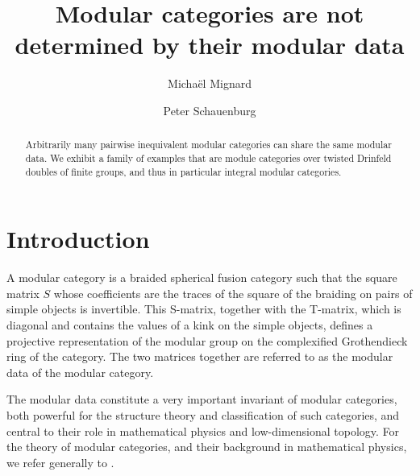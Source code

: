 \documentclass[12pt]{amsart}
\theoremstyle{remark}
\theoremstyle{definition}
\numberwithin{equation}{section}
\begin{document}
\title[Equivalent modular data]{Modular categories are not determined by their modular data}
\author{Michaël Mignard}
\author{Peter Schauenburg}
\address{Institut de Math{\'e}matiques de Bourgogne, UMR 5584 CNRS
\\
Universit{\'e} Bourgogne Franche-Comté\\
F-21000 Dijon\\France}

\keywords{}

\begin{abstract}
Arbitrarily many pairwise inequivalent modular categories can share the same modular data. We exhibit a family of examples that are module categories over twisted Drinfeld doubles of finite groups, and thus in particular integral modular categories.
\end{abstract}
\maketitle

\section{Introduction}
\label{sec:introduction}

A modular category is a braided spherical fusion category such that the square matrix $S$ whose coefficients are the traces of the square of the braiding on pairs of simple objects is invertible. This S-matrix, together with the T-matrix, which is diagonal and contains the values of a kink on the simple objects, defines a projective representation of the modular group on the complexified Grothendieck ring of the category. The two matrices together are referred to as the modular data of the modular category. 

The modular data constitute a very important invariant of modular categories, both powerful for the structure theory and classification of such categories, and central to their role in mathematical physics and low-dimensional topology. For the theory of modular categories, and their background in mathematical physics, we refer generally to \cite{BakKir:LTCMF}. 
\end{document}
